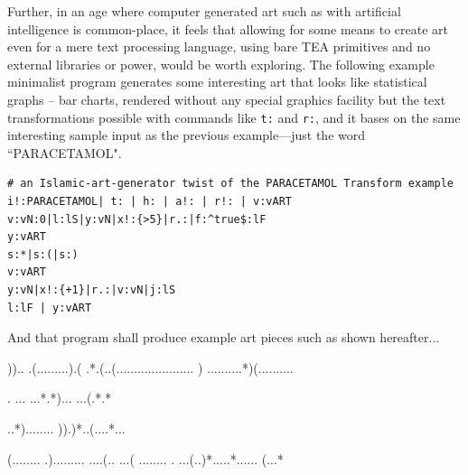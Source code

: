 \documentclass[a4paper, 18pt]{book} %
\begin{document}
{{{\vspace{2em}


Further, in an age where computer generated art such as with artificial intelligence is common-place, it feels that allowing for some means to create art even for a mere text processing language, using bare TEA primitives and no external libraries or power, would be worth exploring. The following example minimalist program generates some interesting art that looks like statistical graphs – bar charts, rendered without any special graphics facility but the text transformations possible with commands like \texttt{t:} and \texttt{r:}, and it bases on the same interesting sample input as the previous example---just the word ``PARACETAMOL".


\vspace{1em}

  \begin{tcolorbox}[teaterminalstyle, title=T: EXAMPLE 3: Islamic ASCII-art Generator based T-reduction, breakable]
  \begin{lstlisting}[language=TEA,breaklines=true,]
# an Islamic-art-generator twist of the PARACETAMOL Transform example
i!:PARACETAMOL| t: | h: | a!: | r!: | v:vART
v:vN:0|l:lS|y:vN|x!:{>5}|r.:|f:^true$:lF
y:vART
s:*|s:(|s:)
v:vART
y:vN|x!:{+1}|r.:|v:vN|j:lS
l:lF | y:vART 
   \end{lstlisting}
  \end{tcolorbox}

\vspace{1em}

And that program shall produce example art pieces such as shown hereafter...


\vspace{2em}

     \begin{tcbverbatim}[title=T: SAMPLE OUTPUT 1 from EXAMPLE 3]
))..
.(.........).(
.*.(..(......................
)
..........*)(..........

.
...
...*.*)...
...(.*.*
  \end{tcbverbatim}


\vspace{2em}


     \begin{tcbverbatim}[title=T: SAMPLE OUTPUT 2 from EXAMPLE 3]
..*)........
)).)*..(....*...

(........
.).........
....(..
...(
........
.
...(..)*.....*......
(...*
  \end{tcbverbatim}


}}}
\end{document}
